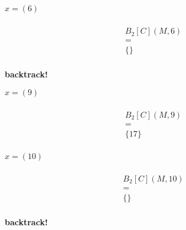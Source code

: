 \begin{minipage}[t]{8cm}
    \begin{minipage}{2.5cm}
        \centering
        \vspace{0.7mm}
        $x=(6)$
        \begin{graybox}
            \setlength{\abovedisplayskip}{0pt}
            \setlength{\belowdisplayskip}{0pt}
            \vspace{-0.5em}
            \begin{gather*}
                \\B_2[C](M,6)\\=\\\{\}\\
            \end{gather*}
        \end{graybox}
        {\large\bf backtrack!}
    \end{minipage}
    \begin{minipage}{2.5cm}
        \centering
        \vspace{0.7mm}
        $x=(9)$
        \begin{graybox}
            \setlength{\abovedisplayskip}{0pt}
            \setlength{\belowdisplayskip}{0pt}
            \vspace{-0.5em}
            \begin{gather*}
                \\B_2[C](M,9)\\=\\\{17\}\\
            \end{gather*}
        \end{graybox}
        \vspace{-0.75em}
        {\Huge{}}
    \end{minipage}
    \begin{minipage}{2.5cm}
        \centering
        \vspace{0.7mm}
        $x=(10)$
        \begin{graybox}
            \setlength{\abovedisplayskip}{0pt}
            \setlength{\belowdisplayskip}{0pt}
            \vspace{-0.5em}
            \begin{gather*}
                \\B_2[C](M,10)\\=\\\{\}\\
            \end{gather*}
        \end{graybox}
        {\large\bf backtrack!}
    \end{minipage}


\end{minipage}
